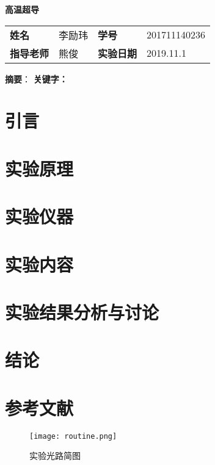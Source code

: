 \documentclass[UTF8]{ctexart}
\begin{document}
\begin{center}
\Huge\textbf{高温超导}
\renewcommand{\baselinestretch}{5.0}
\end{center}
\begin{center}
\small
\begin{tabular}{llll}
\textbf{姓名}&李励玮     &\textbf{学号}  &201711140236\\
\textbf{指导老师}&熊俊 &\textbf{实验日期}& 2019.11.1\\
\end{tabular}
\end{center}

\small
\noindent\textbf{摘要}：
\newline\textbf{关键字：}

\section{引言}
\begin{multicols}{2}
\end{multicols}

\section{实验原理}
\begin{multicols}{2}
\subsection{}
\end{multicols}

\section{实验仪器}
\begin{multicols}{2}
\end{multicols}

\section{实验内容}
\begin{multicols}{2}
\end{multicols}

\section{实验结果分析与讨论}

\section{结论}

\section{参考文献}
\small
\noindent

\begin{figure}[H]
\texttt{[image: routine.png]}
\caption{\small{实验光路简图}}
\end{figure}

\begin{figure}[H]
\end{figure}
\end{document}
